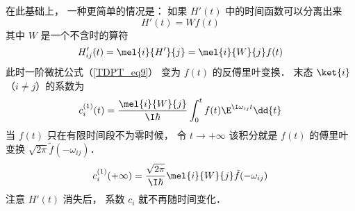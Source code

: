 在此基础上， 一种更简单的情况是： 如果 $H'(t)$ 中的时间函数可以分离出来
\begin{equation}
H'(t) = W f(t)
\end{equation}
其中 $W$ 是一个不含时的算符
\begin{equation}
H'_{ij}(t) = \mel{i}{H'}{j} = \mel{i}{W}{j}f(t)
\end{equation}
此时一阶微扰公式（\autoref{TDPT_eq9}） 变为 $f(t)$ 的反傅里叶变换． 末态 $\ket{i}$ （$i \neq j$）的系数为
\begin{equation}
c_i^{(1)}(t) = \frac{\mel{i}{W}{j}}{\I\hbar} \int_0^t f(t)\E^{\I\omega_{ij} t} \dd{t}
\end{equation}
当 $f(t)$ 只在有限时间段不为零时候， 令 $t\to+\infty$ 该积分就是 $f(t)$ 的傅里叶变换 $\sqrt{2\pi}\tilde f(-\omega_{ij})$．
\begin{equation}
c_i^{(1)}(+\infty) = \frac{\sqrt{2\pi}}{\I\hbar} \mel{i}{W}{j}\tilde f(-\omega_{ij})
\end{equation}
注意 $H'(t)$ 消失后， 系数 $c_i$ 就不再随时间变化．
